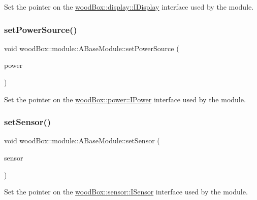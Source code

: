 Set the pointer on the \mbox{\hyperlink{classwood_box_1_1display_1_1_i_display}{wood\+Box\+::display\+::\+I\+Display}} interface used by the module. \mbox{\label{classwood_box_1_1module_1_1_a_base_module_a117ce9fbbcef048ccde38f0b6a11aa91}} 
\subsubsection{\texorpdfstring{set\+Power\+Source()}{setPowerSource()}}
{\footnotesize\ttfamily void wood\+Box\+::module\+::\+A\+Base\+Module\+::set\+Power\+Source (\begin{DoxyParamCaption}\item[{\mbox{\hyperlink{classwood_box_1_1power_1_1_i_power}{power\+::\+I\+Power}} $\ast$}]{power }\end{DoxyParamCaption})}

Set the pointer on the \mbox{\hyperlink{classwood_box_1_1power_1_1_i_power}{wood\+Box\+::power\+::\+I\+Power}} interface used by the module. \mbox{\label{classwood_box_1_1module_1_1_a_base_module_ac3fd88feae532ca88b14642f76ef8def}} 
\subsubsection{\texorpdfstring{set\+Sensor()}{setSensor()}}
{\footnotesize\ttfamily void wood\+Box\+::module\+::\+A\+Base\+Module\+::set\+Sensor (\begin{DoxyParamCaption}\item[{\mbox{\hyperlink{classwood_box_1_1sensor_1_1_i_sensor}{sensor\+::\+I\+Sensor}} $\ast$}]{sensor }\end{DoxyParamCaption})}

Set the pointer on the \mbox{\hyperlink{classwood_box_1_1sensor_1_1_i_sensor}{wood\+Box\+::sensor\+::\+I\+Sensor}} interface used by the module. \mbox{\label{classwood_box_1_1module_1_1_a_base_module_af9e009af37d04062c2da7d977baded80}} 
